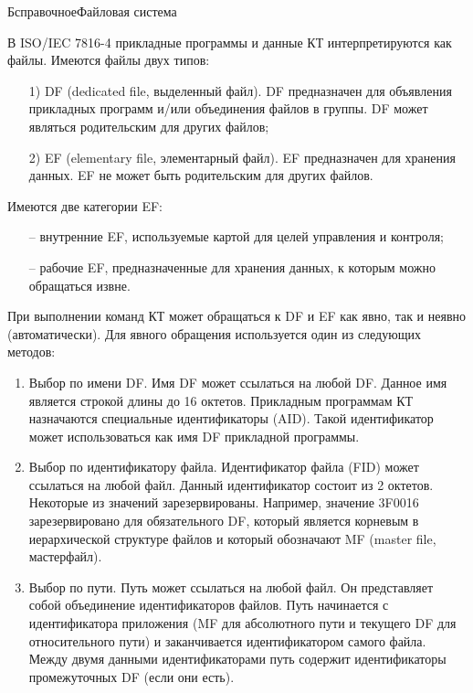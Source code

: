 \begin{appendix}{Б}{справочное}{Файловая система}
\label{FILES}


В ISO/IEC 7816-4 прикладные программы и данные КТ интерпретируются как 
файлы. Имеются файлы двух типов: 

\begin{enumerate}
\item[1)]
DF (dedicated file, выделенный файл). DF предназначен для 
объявления прикладных программ и/или объединения файлов в группы. DF может 
являться родительским для других файлов;

\item[2)]
EF (elementary file, элементарный файл). EF предназначен для 
хранения данных. EF не может быть родительским для других файлов.  
\end{enumerate}

Имеются две категории EF:
\begin{itemize}
\item[--] 
внутренние EF, используемые картой для целей управления и контроля;  
\item[--]
рабочие EF, предназначенные для хранения данных, к которым можно обращаться извне.
\end{itemize}                                                            
                  
При выполнении команд КТ может обращаться к DF и EF как явно, так и неявно 
(автоматически). Для явного обращения используется один из следующих 
методов: 
\begin{enumerate}
\item
Выбор по имени DF. Имя DF может ссылаться на любой DF. Данное имя 
является строкой длины до 16 октетов. Прикладным программам КТ назначаются 
специальные идентификаторы (AID). Такой идентификатор может использоваться 
как имя DF прикладной программы. 

\item
Выбор по идентификатору файла. Идентификатор файла (FID) может 
ссылаться на любой файл. Данный идентификатор состоит из 2 октетов. 
Некоторые из значений зарезервированы. Например, значение 3F0016 
зарезервировано для обязательного DF, который является корневым в 
иерархической структуре файлов и который обозначают MF (master file, 
мастерфайл). 

\item
Выбор по пути. Путь может ссылаться на любой файл. Он 
представляет собой объединение идентификаторов файлов. Путь начинается с 
идентификатора приложения (MF для абсолютного пути и текущего DF для 
относительного пути) и заканчивается идентификатором самого файла. Между 
двумя данными идентификаторами путь содержит идентификаторы промежуточных 
DF (если они есть). 


\end{enumerate}
\end{appendix}
